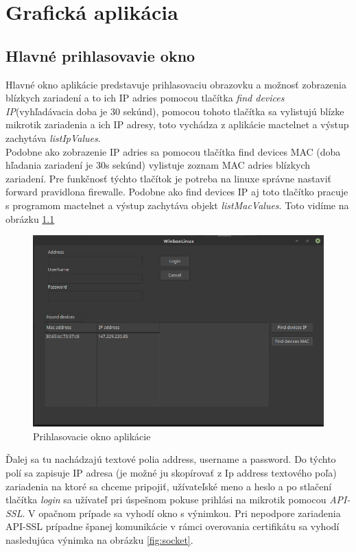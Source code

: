 \chapter{Grafická aplikácia}
\section{Hlavné prihlasovavie okno}
Hlavné okno aplikácie predstavuje prihlasovaciu obrazovku a možnosť zobrazenia blízkych zariadení a to ich IP adries pomocou tlačítka \textit{find devices IP}(vyhľadávacia doba je 30 sekúnd), pomocou tohoto tlačítka sa vylistujú blízke mikrotik zariadenia a ich IP adresy, toto vychádza z aplikácie mactelnet a výstup zachytáva \textit{listIpValues}.\\
Podobne ako zobrazenie IP adries sa pomocou tlačítka find devices MAC (doba hľadania zariadení je 30s sekúnd) vylistuje zoznam MAC adries blízkych zariadení. Pre funkčnosť týchto tlačítok je potreba na linuxe správne nastaviť forward pravidlona firewalle. Podobne ako find devices IP aj toto tlačítko pracuje s programom mactelnet a výstup zachytáva objekt \textit{listMacValues}. Toto vidíme na obrázku \ref{fig:winboxlinux}\\
\begin{figure}[H]
\centering
\includegraphics[scale=0.45]{../text/linuxwinbox.png}
\caption{Prihlasovacie okno aplikácie}
\label{fig:winboxlinux}
\end{figure}
Ďalej sa tu nachádzajú textové polia address, username a password. Do týchto polí sa zapisuje IP adresa (je možné ju skopírovať z Ip address textového poľa) zariadenia na ktoré sa chceme pripojiť, užívateľské meno  a heslo a po stlačení tlačítka \textit{login} sa užívateľ pri úspešnom pokuse prihlási na mikrotik pomocou \textit{API-SSL}. V opačnom prípade sa vyhodí okno s výnimkou. Pri nepodpore zariadenia API-SSL prípadne španej komunikácie v rámci overovania certifikátu sa vyhodí nasledujúca výnimka na obrázku \ref{fig:socket}.
